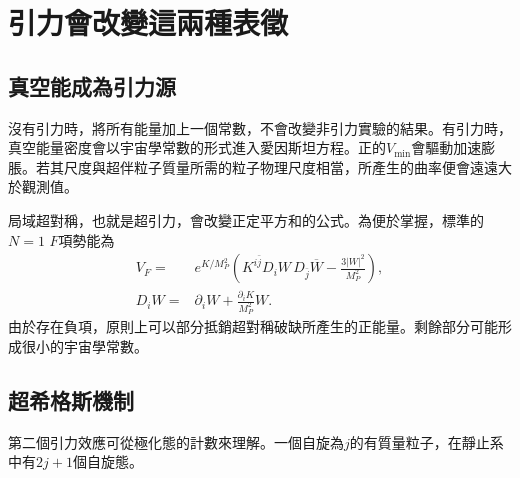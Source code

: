\section{引力會改變這兩種表徵}

\subsection{真空能成為引力源}

沒有引力時，將所有能量加上一個常數，不會改變非引力實驗的結果。有引力時，真空能量密度會以宇宙學常數的形式進入愛因斯坦方程。正的\(V_{\min}\)會驅動加速膨脹。若其尺度與超伴粒子質量所需的粒子物理尺度相當，所產生的曲率便會遠遠大於觀測值。

\begin{classroomqa}
\end{classroomqa}

局域超對稱，也就是超引力，會改變正定平方和的公式。為便於掌握，標準的\(N=1\) \(F\)項勢能為
\begin{equation}
\begin{aligned}
V_F={}&e^{K/M_P^2}
\left(
K^{i\bar j}D_iW\,D_{\bar j}\overline W
-\frac{3|W|^2}{M_P^2}
\right),\\
D_iW={}&\partial_iW+\frac{\partial_iK}{M_P^2}W.
\end{aligned}
\label{eq:l9-sugra-potential}
\end{equation}
由於存在負項，原則上可以部分抵銷超對稱破缺所產生的正能量。剩餘部分可能形成很小的宇宙學常數。


\subsection{超希格斯機制}

第二個引力效應可從極化態的計數來理解。一個自旋為\(j\)的有質量粒子，在靜止系中有\(2j+1\)個自旋態。

\begin{classroomqa}
\end{classroomqa}

